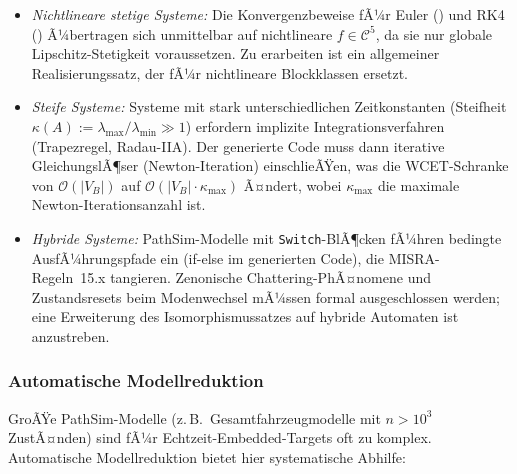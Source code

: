 ﻿\documentclass[12pt,a4paper]{article}
\theoremstyle{definition}
\begin{document}
\begin{itemize}
  \item \emph{Nichtlineare stetige Systeme:} Die Konvergenzbeweise fÃ¼r
        Euler () und RK4 () Ã¼bertragen
        sich unmittelbar auf nichtlineare $f \in \mathcal{C}^5$, da sie
        nur globale Lipschitz-Stetigkeit voraussetzen. Zu erarbeiten ist
        ein allgemeiner Realisierungssatz, der  fÃ¼r
        nichtlineare Blockklassen ersetzt.

  \item \emph{Steife Systeme:} Systeme mit stark unterschiedlichen
        Zeitkonstanten (Steifheit $\kappa(A) := \lambda_{\max}/\lambda_{\min}
        \gg 1$) erfordern implizite Integrationsverfahren
        (Trapezregel, Radau-IIA). Der generierte Code muss dann
        iterative GleichungslÃ¶ser (Newton-Iteration) einschlieÃŸen,
        was die WCET-Schranke von $\mathcal{O}(|V_B|)$ auf
        $\mathcal{O}(|V_B| \cdot \kappa_{\max})$ Ã¤ndert, wobei
        $\kappa_{\max}$ die maximale Newton-Iterationsanzahl ist.

  \item \emph{Hybride Systeme:} PathSim-Modelle mit
        \texttt{Switch}-BlÃ¶cken fÃ¼hren bedingte AusfÃ¼hrungspfade ein
        (if-else im generierten Code), die MISRA-Regeln~15.x tangieren.
        Zenonische Chattering-PhÃ¤nomene und Zustandsresets beim
        Modenwechsel mÃ¼ssen formal ausgeschlossen werden; eine
        Erweiterung des Isomorphismussatzes auf hybride Automaten
        ist anzustreben.
\end{itemize}

\subsubsection{Automatische Modellreduktion}

GroÃŸe PathSim-Modelle (z.\,B.\ Gesamtfahrzeugmodelle mit $n > 10^3$
ZustÃ¤nden) sind fÃ¼r Echtzeit-Embedded-Targets oft zu komplex. Automatische
Modellreduktion bietet hier systematische Abhilfe:
\end{document}
